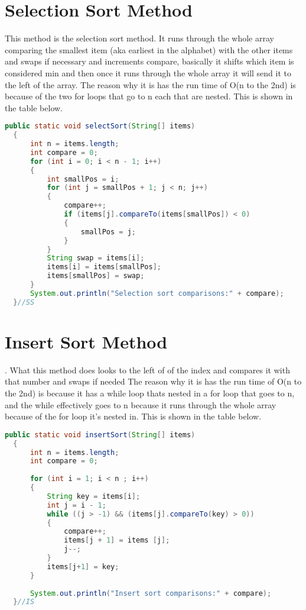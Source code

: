 \documentclass[letterpaper, 10pt]{article}
\begin{document}
\section{Selection Sort Method}
This method is the selection sort method. It runs through the whole array comparing the smallest item (aka earliest in the alphabet) with the other items and swaps if necessary and increments compare, basically it shifts which item is considered min and then once it runs through the whole array it will send it to the left of the array. The reason why it is has the run time of O(n to the 2nd) is because of the two for loops that go to n each that are nested. This is shown in the table below.
\begin{lstlisting}[language = java]
public static void selectSort(String[] items)
  {
	  int n = items.length;
	  int compare = 0;
	  for (int i = 0; i < n - 1; i++)
	  {
		  int smallPos = i;
		  for (int j = smallPos + 1; j < n; j++)
		  {
			  compare++;
			  if (items[j].compareTo(items[smallPos]) < 0)
			  {
				  smallPos = j;
			  }
		  }
		  String swap = items[i];
		  items[i] = items[smallPos];
		  items[smallPos] = swap;
	  }
	  System.out.println("Selection sort comparisons:" + compare);
  }//SS

\end{lstlisting}

\section{Insert Sort Method}.
What this method does looks to the left of of the index and compares it with that number and swaps if needed
The reason why it is has the run time of O(n to the 2nd) is because it has a while loop thats nested in a for loop that goes to n, and the while effectively goes to n because it runs through the whole array because of the for loop it's nested in. This is shown in the table below.
\begin{lstlisting}[language = java]
public static void insertSort(String[] items)
  {
	  int n = items.length;
	  int compare = 0;
	  
	  for (int i = 1; i < n ; i++)
	  {
		  String key = items[i];
		  int j = i - 1;
		  while ((j > -1) && (items[j].compareTo(key) > 0))
		  {
			  compare++;
			  items[j + 1] = items [j];
			  j--;
		  }
		  items[j+1] = key;
	  }
	  
	  System.out.println("Insert sort comparisons:" + compare);
  }//IS

\end{lstlisting}
\end{document}
